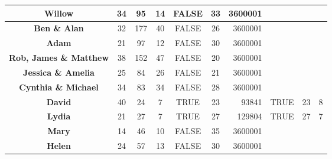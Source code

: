 \documentclass{report}
\theoremstyle{plain}
\begin{document}
\begin{figure}
\begin{tabular}{cc|c|c|c|c|r|c|c|c|}
\multicolumn{1}{|c|}{\textbf{Willow}}                & 34                & 95               & 14                    & FALSE           & 33                 & 3600001       &                &                  &                       \\ \hline
\multicolumn{1}{|c|}{\textbf{Ben \& Alan}}           & 32                & 177              & 40                    & FALSE           & 26                 & 3600001       &                &                  &                       \\ \hline
\multicolumn{1}{|c|}{\textbf{Adam}}                  & 21                & 97               & 12                    & FALSE           & 30                 & 3600001       &                &                  &                       \\ \hline
\multicolumn{1}{|c|}{\textbf{Rob, James \& Matthew}} & 38                & 152              & 47                    & FALSE           & 20                 & 3600001       &                &                  &                       \\ \hline
\multicolumn{1}{|c|}{\textbf{Jessica \& Amelia}}     & 25                & 84               & 26                    & FALSE           & 21                 & 3600001       &                &                  &                       \\ \hline
\multicolumn{1}{|c|}{\textbf{Cynthia \& Michael}}    & 34                & 83               & 34                    & FALSE           & 28                 & 3600001       &                &                  &                       \\ \hline
\multicolumn{1}{|c|}{\textbf{David}}                 & 40                & 24               & 7                     & TRUE            & 23                 & 93841         & TRUE           & 23               & 8                     \\ \hline
\multicolumn{1}{|c|}{\textbf{Lydia}}                 & 21                & 27               & 7                     & TRUE            & 27                 & 129804        & TRUE           & 27               & 7                     \\ \hline
\multicolumn{1}{|c|}{\textbf{Mary}}                  & 14                & 46               & 10                    & FALSE           & 35                 & 3600001       &                &                  &                       \\ \hline
\multicolumn{1}{|c|}{\textbf{Helen}}                 & 24                & 57               & 13                    & FALSE           & 30                 & 3600001       &                &                  &                       \\ \hline

\end{tabular}
\end{figure}
\end{document}
